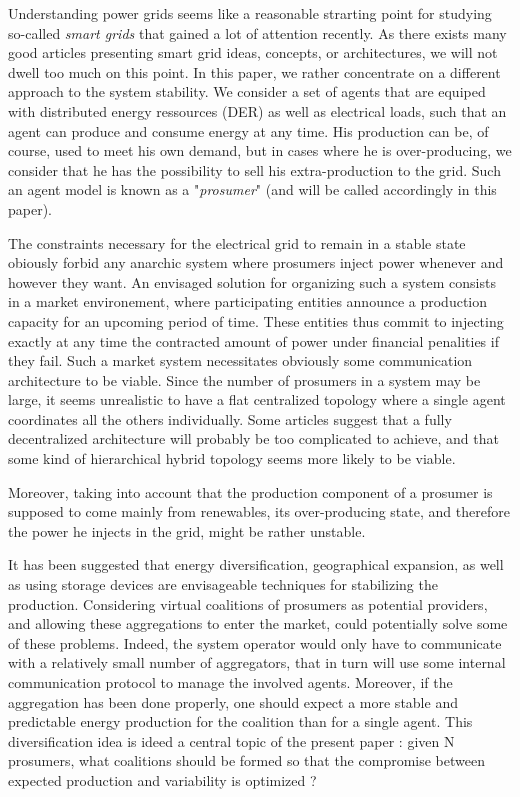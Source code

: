 \documentclass[conference]{IEEEtran}
\begin{document}
Understanding power grids seems like a reasonable strarting point for studying so-called \textit{smart grids} that gained a lot of attention recently. As there exists many good articles presenting smart grid ideas, concepts, or architectures, we will not dwell too much on this point. In this paper, we rather concentrate on a different approach to the system stability. We consider a set of agents that are equiped with distributed energy ressources (DER) as well as electrical loads, such that an agent can produce and consume energy at any time. His production can be, of course, used to meet his own demand, but in cases where he is over-producing, we consider that he has the possibility to sell his extra-production to the grid. Such an agent model is known as a "\textit{prosumer}" (and will be called accordingly in this paper). 

The constraints necessary for the electrical grid to remain in a stable state obiously forbid any anarchic system where prosumers inject power whenever and however they want. An envisaged solution for organizing such a system consists in a market environement, where participating entities announce a production capacity for an upcoming period of time. These entities thus commit to injecting exactly at any time the contracted amount of power under financial penalities if they fail. Such a market system necessitates obviously some communication architecture to be viable. Since the number of prosumers in a system may be large, it seems unrealistic to have a flat centralized topology where a single agent coordinates all the others individually. Some articles suggest that a fully decentralized architecture will probably be too complicated to achieve, and that some kind of hierarchical hybrid topology seems more likely to be viable.

Moreover, taking into account that the production component of a prosumer is supposed to come mainly from renewables, its over-producing state, and therefore the power he injects in the grid, might be rather unstable.

It has been suggested that energy diversification, geographical expansion, as well as using storage devices are envisageable techniques for  stabilizing the production. Considering virtual coalitions of prosumers as potential providers, and allowing these aggregations to enter the market, could potentially solve some of these problems. Indeed, the system operator would only have to communicate with a relatively small number of aggregators, that in turn will use some internal communication protocol to manage the involved agents. Moreover, if the aggregation has been done properly, one should expect a more stable and predictable energy production for the coalition than for a single agent. This diversification idea is ideed a central topic of the present paper : given N prosumers, what coalitions should be formed so that the compromise between expected production and variability is optimized ?
\end{document}
